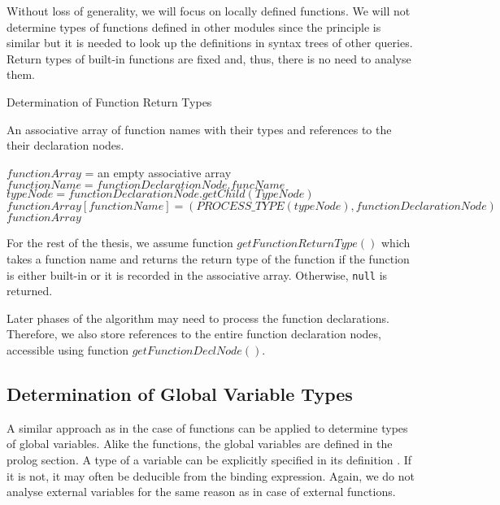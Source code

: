 Without loss of generality, we will focus on locally defined functions. We will not determine types of functions defined in other modules since the principle is similar but it is needed to look up the definitions in syntax trees of other queries. Return types of built-in functions are fixed and, thus, there is no need to analyse them.

\begin{algorithm}
\caption{Determination of Function Return Types}
\label{ALG_determination_of_function_return_types}
\begin{algorithmic}[1]
\ENSURE An associative array of function names with their types and references to the their declaration nodes.

\STATE $functionArray$ = an empty associative array
    \STATE $functionName = functionDeclarationNode.funcName$
    \STATE $typeNode = functionDeclarationNode.getChild(TypeNode)$
    \STATE $functionArray[functionName] = (PROCESS\_TYPE(typeNode), functionDeclarationNode)$
\ENDFOR
\RETURN $functionArray$
\end{algorithmic}
\end{algorithm}


For the rest of the thesis, we assume function  $getFunctionReturnType()$ which takes a function name and returns the return type of the function if the function is either built-in or it is recorded in the associative array. Otherwise, \texttt{null} is returned.

Later phases of the algorithm may need to process the function declarations. Therefore, we also store references to the entire function declaration nodes, accessible using function $getFunctionDeclNode()$.

\subsection{Determination of Global Variable Types}
A similar approach as in the case of functions can be applied to determine types of global variables. Alike the functions, the global variables are defined in the prolog section. A type of a variable can be explicitly specified in its definition . If it is not, it may often be deducible from the binding expression. Again, we do not analyse external variables for the same reason as in case of external functions.

